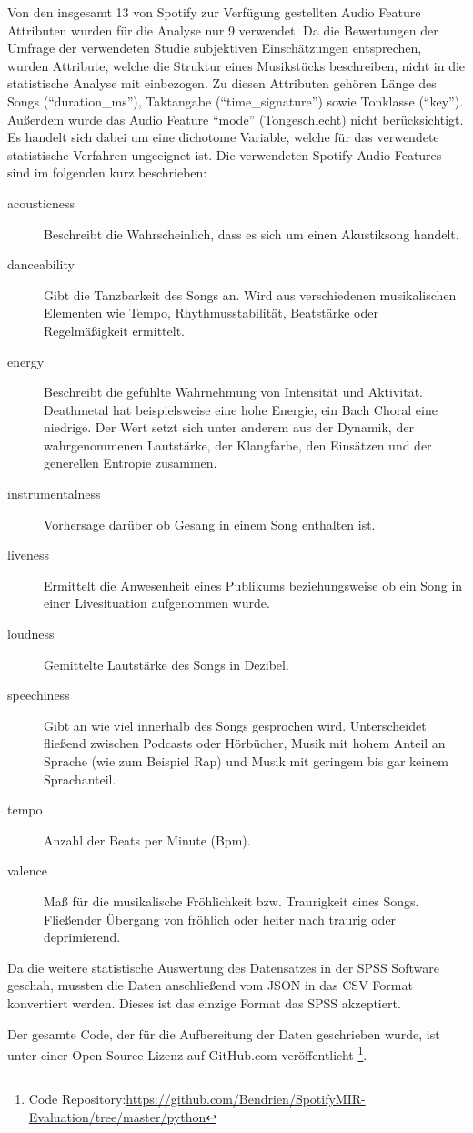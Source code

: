 Von den insgesamt 13 von Spotify zur Verfügung gestellten Audio Feature Attributen wurden für die Analyse nur 9 verwendet.
Da die Bewertungen der Umfrage der verwendeten Studie subjektiven Einschätzungen entsprechen, wurden Attribute, welche die Struktur eines Musikstücks beschreiben, nicht in die statistische Analyse mit einbezogen.
Zu diesen Attributen gehören Länge des Songs ("`duration\_ms"'), Taktangabe ("`time\_signature"') sowie  Tonklasse ("`key"').
Außerdem wurde das Audio Feature "`mode"' (Tongeschlecht) nicht berücksichtigt. Es handelt sich dabei um eine dichotome Variable, welche für das verwendete statistische Verfahren ungeeignet ist.
Die verwendeten Spotify Audio Features sind im folgenden kurz beschrieben:

\begin{description}
    \item[acousticness]
        Beschreibt die Wahrscheinlich, dass  es sich um einen Akustiksong handelt.
    \item[danceability]
        Gibt die Tanzbarkeit des Songs an.
        Wird aus verschiedenen musikalischen Elementen wie Tempo, Rhythmusstabilität, Beatstärke oder Regelmäßigkeit ermittelt.
    \item[energy]
        Beschreibt die gefühlte Wahrnehmung von Intensität und Aktivität.
        Deathmetal hat beispielsweise eine hohe Energie, ein Bach Choral eine niedrige. Der Wert setzt sich unter anderem aus der Dynamik, der wahrgenommenen Lautstärke, der Klangfarbe, den Einsätzen und der generellen Entropie zusammen.
    \item[instrumentalness]
        Vorhersage darüber ob Gesang in einem Song enthalten ist.
    \item[liveness]
        Ermittelt die Anwesenheit eines Publikums beziehungsweise ob ein Song in einer Livesituation aufgenommen wurde.
    \item[loudness]
        Gemittelte Lautstärke des Songs in Dezibel.
    \item[speechiness]
        Gibt an wie viel innerhalb des Songs gesprochen wird.
        Unterscheidet fließend zwischen Podcasts oder Hörbücher, Musik mit hohem Anteil an Sprache (wie zum Beispiel Rap) und Musik mit geringem bis gar keinem Sprachanteil.
    \item[tempo]
        Anzahl der Beats per Minute (Bpm).
    \item[valence]
        Maß für die musikalische Fröhlichkeit bzw. Traurigkeit eines Songs.
        Fließender Übergang von fröhlich oder heiter nach traurig oder deprimierend.
\end{description}

Da die weitere statistische Auswertung des Datensatzes in der SPSS Software geschah, mussten die Daten anschließend vom JSON in das CSV Format konvertiert werden. Dieses ist das einzige Format das SPSS akzeptiert.

Der gesamte Code, der für die Aufbereitung der Daten geschrieben wurde, ist unter einer Open Source Lizenz auf GitHub.com veröffentlicht \footnote{Code Repository:\hfill \url{https://github.com/Bendrien/SpotifyMIR-Evaluation/tree/master/python}}.

